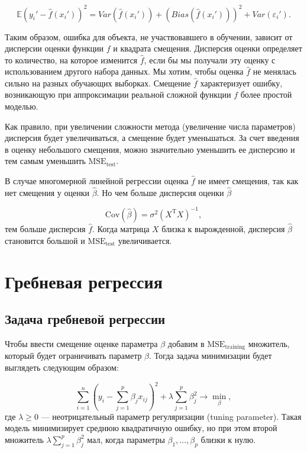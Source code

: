 \documentclass[specialist,
               subf,href,colorlinks=true, 12pt,a4paper]{article} %
\newcommand{\E}{\mathbb{E}}
\newcommand{\T}{\mathrm{T}}
\numberwithin{equation}{section}
\begin{document}
\begin{equation*}
\E(y_i' - \hat{f}(x_i'))^2 = Var(\hat{f}(x_i')) + (Bias(\hat{f}(x_i')))^2 + Var(\varepsilon_i').
\end{equation*}

Таким образом, ошибка для объекта, не участвовавшего в обучении, зависит от дисперсии оценки функции $f$ и квадрата смещения. Дисперсия оценки определяет то количество, на которое изменится $\hat{f}$, если бы мы получали эту оценку с использованием другого набора данных. Мы хотим, чтобы оценка $\hat{f}$ не менялась сильно на разных обучающих выборках. Смещение $\hat{f}$ характеризует ошибку, возникающую при аппроксимации реальной сложной функции $f$ более простой моделью.

Как правило, при увеличении сложности метода (увеличение числа параметров) дисперсия будет увеличиваться, а смещение будет уменьшаться. За счет введения в оценку небольшого смещения, можно значительно уменьшить ее дисперсию и тем самым уменьшить $\mathrm{MSE}_{\mathrm{test}}$.

В случае многомерной линейной регрессии оценка $\hat{f}$ не имеет смещения, так как нет смещения у оценки $\hat{\beta}$. Но чем больше дисперсия оценки $\hat{\beta}$ 

\begin{equation*}
\mathrm{Cov}(\hat{\beta}) = \sigma^2(X^{\T}X)^{-1},
\end{equation*}
тем больше дисперсия $\hat{f}$. Когда матрица $X$ близка к вырожденной, дисперсия $\hat{\beta}$ становится большой и $\mathrm{MSE}_{\mathrm{test}}$ увеличивается.


\section{Гребневая регрессия}

\subsection{Задача гребневой регрессии}

Чтобы ввести смещение оценке параметра $\beta$ добавим в $\mathrm{MSE}_{\mathrm{training}}$ множитель, который будет ограничивать параметр $\beta$. Тогда задача минимизации будет выглядеть следующим образом:

\begin{equation*}
\sum_{i=1}^n(y_i - \sum_{j=1}^p \beta_j x_{ij})^2  + \lambda \sum_{j = 1}^p \beta_j^2 \rightarrow \min_{\beta},
\end{equation*}
где $\lambda \geq 0$ --- неотрицательный параметр регуляризации (tuning parameter). Такая модель минимизирует среднюю квадратичную ошибку, но при этом второй множитель $\lambda\sum_{j = 1}^p \beta_j^2$ мал, когда параметры $\beta_1, \ldots, \beta_p$ близки к нулю. 
\end{document}
